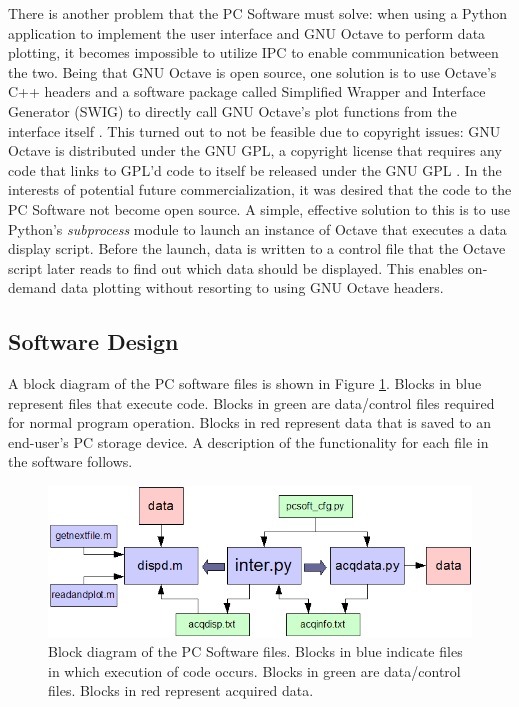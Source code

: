 There is another problem that the PC Software must solve: when using a Python application to 
implement the user interface and GNU Octave to perform data plotting, it becomes impossible to 
utilize IPC to enable communication between the two. Being that GNU Octave is open source, one 
solution is to use Octave's C++ headers and a software package called Simplified Wrapper and Interface
 Generator (SWIG) to directly call  GNU Octave's plot functions from the interface itself \cite{web:swig}. 
This turned out to not be feasible due to copyright issues: GNU Octave is distributed under the GNU 
GPL, a copyright license that requires any code that links to GPL'd code to itself be released under 
the GNU GPL \cite{web:gnugpl}. In the interests of potential future commercialization, it was desired 
that the code to the PC Software not become open source. A simple, effective solution to this is to 
use Python's \textit{subprocess} module to launch an instance of Octave that executes a data display 
script. Before the launch, data is written to a control file that the Octave script later reads 
to find out which data should be displayed. This enables on-demand data plotting without resorting 
to using GNU Octave headers.

\subsection[Software Design]{Software Design}
A block diagram of the PC software files is shown in Figure \ref{fig:pcsoft files diagram}. Blocks 
in blue represent files that execute code. Blocks in green are data/control files required for normal 
program operation. Blocks in red represent data that is saved to an end-user's PC storage device.
 A description of the functionality for each file in the software follows.


\begin{figure}[bhp]
\begin{center}
\includegraphics[scale=0.65]{../drawings/pcsoft_files_diagram.png}
\end{center}
\caption[PC Software Files Block Diagram]{Block diagram of the PC Software files. Blocks in blue
indicate files in which execution of code occurs. Blocks in green are data/control files. Blocks
in red represent acquired data.}
\label{fig:pcsoft files diagram}
\end{figure}


